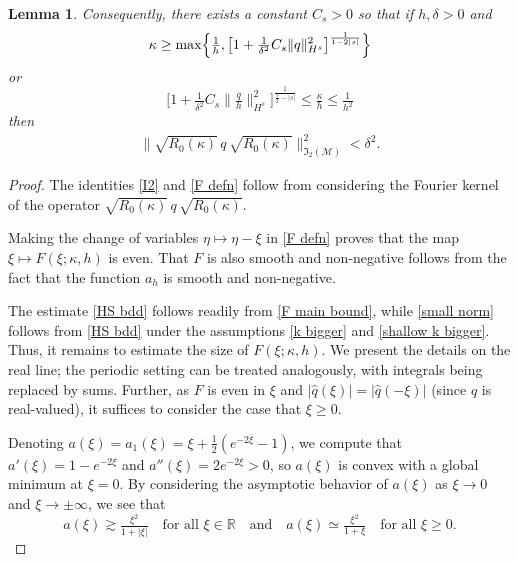 \documentclass{amsart}
\newcommand{\R}{{\mathbb{R}}}
\newtheorem{lemma}[theorem]{Lemma}
\theoremstyle{definition}
\theoremstyle{remark}
\begin{document}
\begin{lemma}
Consequently, there exists a constant \(C_s>0\) so that if \(h,\delta>0\) and
\begin{equation}\label{k bigger}
\kappa \geq \max\Bigl\{\tfrac1h,\bigl[ 1 + \tfrac1{\delta^2} C_s \| q\|_{H^s}^2 \bigr]^{\frac{1}{1-2|s|}}\Bigr\}
\end{equation}
or
\begin{equation}\label{shallow k bigger}
\bigl[ 1 + \tfrac1{\delta^2} C_s\bigl\|\tfrac qh\bigr\|_{H^s}^2 \bigr]^{\frac{1}{\frac32-|s|}}\leq \tfrac\kappa h\leq \tfrac1{h^2}
\end{equation}
then
\begin{align}\label{small norm}
 \| \sqrt{R_0(\kappa)}\, q\, \sqrt{R_0(\kappa)}\|_{\mathfrak I_2(\mathcal M)}^2 <\delta^2.
\end{align}
\end{lemma}
\begin{proof}
The identities \eqref{I2} and \eqref{F defn} follow from considering the Fourier kernel of the operator \(\sqrt{R_0(\kappa)}\, q\, \sqrt{R_0(\kappa)}\).

Making the change of variables \(\eta\mapsto \eta-\xi\) in \eqref{F defn} proves that the map \(\xi\mapsto F(\xi;\kappa,h)\) is even.  That $F$ is also smooth and non-negative follows from the fact that the function $a_h$ is smooth and non-negative.

The estimate \eqref{HS bdd} follows readily from \eqref{F main bound}, while \eqref{small norm} follows from \eqref{HS bdd} under the assumptions \eqref{k bigger} and \eqref{shallow k bigger}.  Thus, it remains to estimate the size of $F(\xi;\kappa,h)$.  We present the details on the real line; the periodic setting can be treated analogously, with integrals being replaced by sums.  Further, as \(F\) is even in \(\xi\) and $|\widehat q(\xi)| = |\widehat q(-\xi)|$ (since $q$ is real-valued), it suffices to consider the case that \(\xi\geq0\). 

Denoting \(a(\xi) = a_1(\xi) = \xi + \tfrac12(e^{-2\xi}-1)\), we compute that \(a'(\xi) = 1 - e^{-2\xi}\) and \(a''(\xi) = 2e^{-2\xi}>0\), so \(a(\xi)\) is convex with a global minimum at \(\xi = 0\). By considering the asymptotic behavior of \(a(\xi)\) as \(\xi\to0\) and \(\xi\to \pm\infty\), we see that
\begin{equation}\label{a bounds}
a(\xi)\gtrsim \tfrac{\xi^2}{1+|\xi|}\quad\text{for all \(\xi\in \R\)}\quad\text{and}\quad a(\xi)\simeq \tfrac{\xi^2}{1+\xi}\quad\text{for all \(\xi\geq0\).}
\end{equation}


\end{proof}
\end{document}
